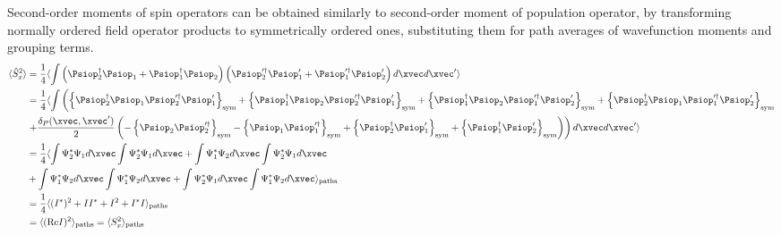 Second-order moments of spin operators can be obtained similarly to second-order moment of population operator, by transforming normally ordered field operator products to symmetrically ordered ones, substituting them for path averages of wavefunction moments and grouping terms.
\begin{equation*}
\begin{split}
	\langle \hat{S}^2_x \rangle
	& = \frac{1}{4} \langle \int \left(
		\Psiop^\dagger_2 \Psiop_1 + \Psiop^\dagger_1 \Psiop_2
	\right)
	\left(
		\Psiop^{\prime\dagger}_2 \Psiop^\prime_1 + \Psiop^{\prime\dagger}_1 \Psiop^\prime_2
	\right) d\xvec d\xvec^\prime \rangle \\
	& = \frac{1}{4} \langle \int \left(
		\symprod{ \Psiop^\dagger_2 \Psiop_1 \Psiop^{\prime\dagger}_2 \Psiop^\prime_1 }
		+ \symprod{ \Psiop^\dagger_1 \Psiop_2 \Psiop^{\prime\dagger}_2 \Psiop^\prime_1 }
		+ \symprod{ \Psiop^\dagger_1 \Psiop_2 \Psiop^{\prime\dagger}_1 \Psiop^\prime_2 }
		+ \symprod{ \Psiop^\dagger_2 \Psiop_1 \Psiop^{\prime\dagger}_1 \Psiop^\prime_2 }
	\right. \\
	& \left.
		+ \frac{\delta_P(\xvec,\xvec^\prime)}{2} \left(
			- \symprod{ \Psiop_2 \Psiop^{\prime\dagger}_2 }
			- \symprod{ \Psiop_1 \Psiop^{\prime\dagger}_1 }
			+ \symprod{ \Psiop^\dagger_2 \Psiop^\prime_1 }
			+ \symprod{ \Psiop^\dagger_1 \Psiop^\prime_2 }
		\right)
	\right) d\xvec d\xvec^\prime \rangle \\
	& = \frac{1}{4} \pathavg{
		\int \Psi^*_2 \Psi_1 d\xvec \int \Psi^*_2 \Psi_1 d\xvec
		+ \int \Psi^*_1 \Psi_2 d\xvec \int \Psi^*_2 \Psi_1 d\xvec \\
	&	+ \int \Psi^*_1 \Psi_2 d\xvec \int \Psi^*_1 \Psi_2 d\xvec
		+ \int \Psi^*_2 \Psi_1 d\xvec \int \Psi^*_1 \Psi_2 d\xvec } \\
	& = \frac{1}{4} \pathavg{ (I^*)^2 + I I^* + I^2 + I^* I } \\
	& = \pathavg{ (\Real I)^2 } = \pathavg{ S^2_x }
\end{split}
\end{equation*}

